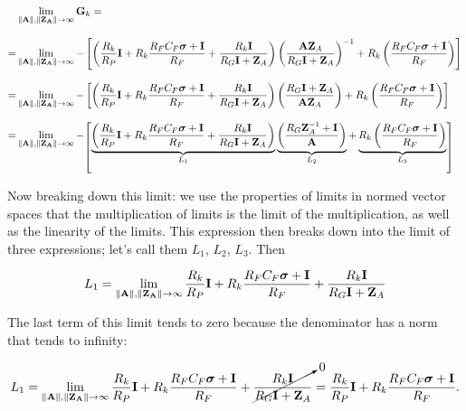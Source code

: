 \begin{align}
	  & \lim\limits_{\left\lVert\mathbf{A}\right\rVert,\left\lVert\mathbf{Z_A}\right\rVert\to\infty } \mathbf{G}_k = \nonumber\\[3mm]
	= & \lim\limits_{\left\lVert\mathbf{A}\right\rVert,\left\lVert\mathbf{Z_A}\right\rVert\to\infty } -\left[\left(\dfrac{R_k}{R_P}\mathbf{I} + R_k\dfrac{R_FC_F \dpo + \mathbf{I}}{R_F} + \dfrac{R_k\mathbf{I}}{R_G\mathbf{I} + \mathbf{Z}_A}\right)\left(\dfrac{\mathbf{A}\mathbf{Z}_A}{R_G\mathbf{I} + \mathbf{Z}_A}\right)^{-1} + R_k\left(\dfrac{R_FC_F \dpo + \mathbf{I}}{R_F}\right)\right] \nonumber\\[3mm]
	= & \lim\limits_{\left\lVert\mathbf{A}\right\rVert,\left\lVert\mathbf{Z_A}\right\rVert\to\infty } -\left[\left(\dfrac{R_k}{R_P}\mathbf{I} + R_k\dfrac{R_FC_F \dpo + \mathbf{I}}{R_F} + \dfrac{R_k\mathbf{I}}{R_G\mathbf{I} + \mathbf{Z}_A}\right)\left(\dfrac{R_G\mathbf{I} + \mathbf{Z}_A}{\mathbf{A}\mathbf{Z}_A}\right) + R_k\left(\dfrac{R_FC_F \dpo + \mathbf{I}}{R_F}\right)\right] \nonumber\\[3mm]
	= & \lim\limits_{\left\lVert\mathbf{A}\right\rVert,\left\lVert\mathbf{Z_A}\right\rVert\to\infty }  - \raisebox{-4mm}{$ \left[\raisebox{4mm}{$ \underbrace{\left(\dfrac{R_k}{R_P}\mathbf{I} + R_k\dfrac{R_FC_F \dpo + \mathbf{I}}{R_F} + \dfrac{R_k\mathbf{I}}{R_G\mathbf{I} + \mathbf{Z}_A}\right)}_{L_1} \underbrace{\left(\dfrac{R_G\mathbf{Z}_A^{-1} + \mathbf{I}}{\mathbf{A}}\right)}_{L_2} + \underbrace{R_k\left(\dfrac{R_FC_F \dpo + \mathbf{I}}{R_F}\right)}_{L_3} $}\right] $} \label{eq:original_limit}
\end{align}

	Now breaking down this limit: we use the properties of limits in normed vector spaces that the multiplication of limits is the limit of the multiplication, as well as the linearity of the limits. This expression then breaks down into the limit of three expressions; let's call them $L_1$, $L_2$, $L_3$. Then

\begin{equation} L_1 = \lim\limits_{\left\lVert\mathbf{A}\right\rVert,\left\lVert\mathbf{Z_A}\right\rVert\to\infty } \dfrac{R_k}{R_P}\mathbf{I} + R_k\dfrac{R_FC_F \boldsymbol{\sigma} + \mathbf{I}}{R_F} + \dfrac{R_k\mathbf{I}}{R_G\mathbf{I} + \mathbf{Z}_A} \end{equation}

	The last term of this limit tends to zero because the denominator has a norm that tends to infinity:

\begin{equation} L_1 = \lim\limits_{\left\lVert\mathbf{A}\right\rVert,\left\lVert\mathbf{Z_A}\right\rVert\to\infty } \dfrac{R_k}{R_P}\mathbf{I} + R_k\dfrac{R_FC_F \boldsymbol{\sigma} + \mathbf{I}}{R_F} + \cancelto{0}{\dfrac{R_k\mathbf{I}}{R_G\mathbf{I} + \mathbf{Z}_A}} = \dfrac{R_k}{R_P}\mathbf{I} + R_k\dfrac{R_FC_F \boldsymbol{\sigma} + \mathbf{I}}{R_F} .\end{equation}

